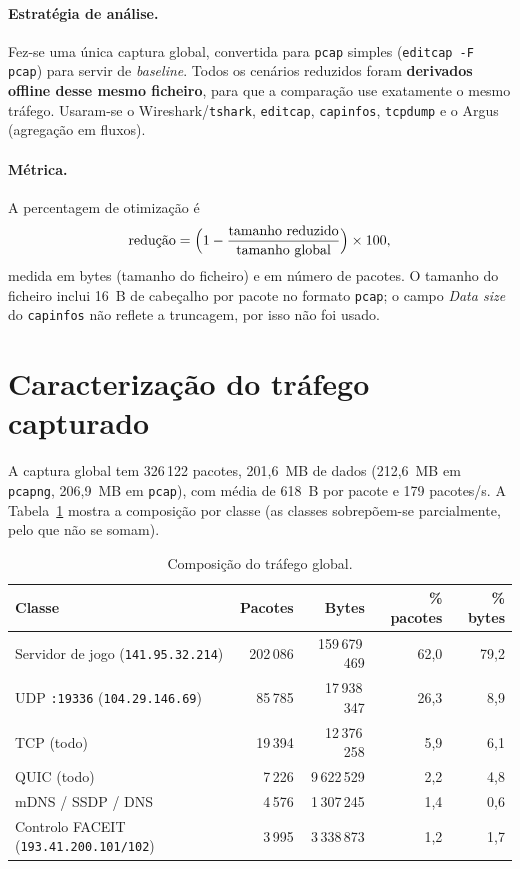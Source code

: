 \documentclass[a4paper,11pt]{article}
\begin{document}
\paragraph{Estratégia de análise.} Fez-se uma única captura global, convertida para \texttt{pcap} simples
(\texttt{editcap -F pcap}) para servir de \emph{baseline}. Todos os cenários reduzidos foram \textbf{derivados offline
desse mesmo ficheiro}, para que a comparação use exatamente o mesmo tráfego. Usaram-se o Wireshark/\texttt{tshark},
\texttt{editcap}, \texttt{capinfos}, \texttt{tcpdump} e o Argus (agregação em fluxos).

\paragraph{Métrica.} A percentagem de otimização é
\[
  \text{redução} = \Bigl(1 - \frac{\text{tamanho reduzido}}{\text{tamanho global}}\Bigr)\times 100,
\]
medida em bytes (tamanho do ficheiro) e em número de pacotes. O tamanho do ficheiro inclui 16~B de cabeçalho por pacote
no formato \texttt{pcap}; o campo \emph{Data size} do \texttt{capinfos} não reflete a truncagem, por isso não foi usado.

\section{Caracterização do tráfego capturado}
A captura global tem 326\,122 pacotes, 201,6~MB de dados (212,6~MB em \texttt{pcapng}, 206,9~MB em \texttt{pcap}),
com média de 618~B por pacote e 179 pacotes/s. A Tabela~\ref{tab:comp} mostra a composição por classe
(as classes sobrepõem-se parcialmente, pelo que não se somam).

\begin{table}[htbp]
\centering
\caption{Composição do tráfego global.}\label{tab:comp}
\begin{tabularx}{\linewidth}{@{}Xrrrr@{}}
\toprule
Classe & Pacotes & Bytes & \% pacotes & \% bytes\\
\midrule
Servidor de jogo (\texttt{141.95.32.214})      & 202\,086 & 159\,679\,469 & 62,0 & 79,2\\
UDP \texttt{:19336} (\texttt{104.29.146.69})   &  85\,785 &  17\,938\,347 & 26,3 &  8,9\\
TCP (todo)                                      &  19\,394 &  12\,376\,258 &  5,9 &  6,1\\
QUIC (todo)                                     &   7\,226 &   9\,622\,529 &  2,2 &  4,8\\
mDNS / SSDP / DNS                               &   4\,576 &   1\,307\,245 &  1,4 &  0,6\\
Controlo FACEIT (\texttt{193.41.200.101/102})   &   3\,995 &   3\,338\,873 &  1,2 &  1,7\\
\bottomrule
\end{tabularx}
\end{table}
\end{document}
